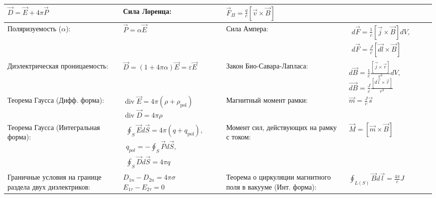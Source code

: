 \documentclass{article}
\begin{document}
\begin{tabular}{ |p{6cm}|p{3.5cm}|p{6cm}|p{3.5cm}|  }
$\vec{D}=\vec{E}+4 \pi \vec{P}$                                            &
Сила Лоренца:                                                              &
$\vec{F}_{\Pi}=\frac{q}{c} [\vec{v} \times \vec{B}]$                       \\
\hline
Поляризуемость ($\alpha$):                                                 &
$\vec{P} = \alpha \vec{E}$                                                 &
Сила Ампера:                                                               &
$\begin{aligned}
d \vec{F}=\frac{1}{c} [\vec{j} \times \vec{B}] d V,  \\
d \vec{F}=\frac{J}{c} [\vec{d{l}} \times \vec{B}]
\end{aligned}$                                                             \\
\hline
Диэлектрическая проницаемость:                                             &
$\vec{D}=(1+4 \pi \alpha) \vec{E}=\varepsilon \vec{E}$                     &
Закон Био-Савара-Лапласа:                                                  &
$d \vec{B}=\frac{1}{c} \frac{[\vec{j} \times \vec{r}]}{r^{3}} d V$,
$\vec{d{B}}=\frac{J}{c} \frac{[d \vec{l} \times \vec{r}]}{r^{3}}$          \\
\hline
Теорема Гаусса (Дифф. форма):                                              &
$\operatorname{div}{\vec{E}} = 4 \pi \left( \rho+\rho_{\mathrm{pol}} \right)$
$\operatorname{div}{\vec{D}} = 4 \pi \rho$                                 &
Магнитный момент рамки:                                                    &
$\vec{m}=\frac{J}{c} \vec{s}$                                              \\
\hline
Теорема Гаусса (Интегральная форма):                                       &
$\begin{aligned}
\oint_{S} \vec{E} d \vec{S}=4 \pi \left(q+q_{\mathrm{pol}}\right),  \\
q_{pol}=-\oint_{S} \vec{P} d \vec{S},                               \\
\oint_{S} \vec{D} d \vec{S}=4 \pi q
\end{aligned}$                                                             &
Момент сил, действующих на рамку с током:                                  &
$\vec{M}= [\vec{m} \times \vec{B}]$                                        \\
\hline
Граничные условия на границе раздела двух диэлектриков:                    &
$D_{1 n}-D_{2 n}=4 \pi \sigma$ $E_{1 \tau}-E_{2 \tau}=0$                   &
Теорема о циркуляции магнитного поля в вакууме (Инт. форма):               &
$\oint_{L(S)} \vec{B} d \vec{l}=\frac{4 \pi}{c} J$                         \\
\hline
\end{tabular}
\end{document}
